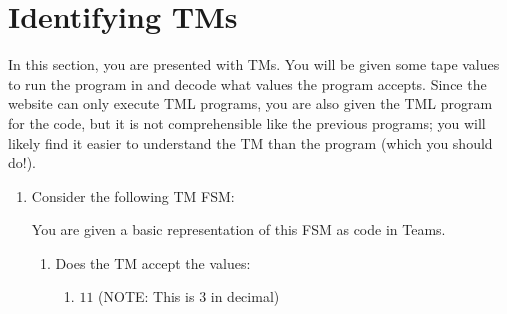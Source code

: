 \documentclass[answers]{exam}
\begin{document}
    \section{Identifying TMs}
    In this section, you are presented with TMs. You will be given some tape values to run the program in and decode what values the program accepts. Since the website can only execute TML programs, you are also given the TML program for the code, but it is not comprehensible like the previous programs; you will likely find it easier to understand the TM than the program (which you should do!). 
    \begin{enumerate}
        \item Consider the following TM FSM:
        \begin{figure}[H]
            \centering
        \end{figure}
        You are given a basic representation of this FSM as code in Teams.
        \begin{enumerate}
            \item Does the TM accept the values:
            \begin{enumerate}
                \item $11$ (NOTE: This is $3$ in decimal)
                \begin{solution}
                    
                \end{solution}


\end{enumerate}
\end{enumerate}
\end{enumerate}
\end{document}
